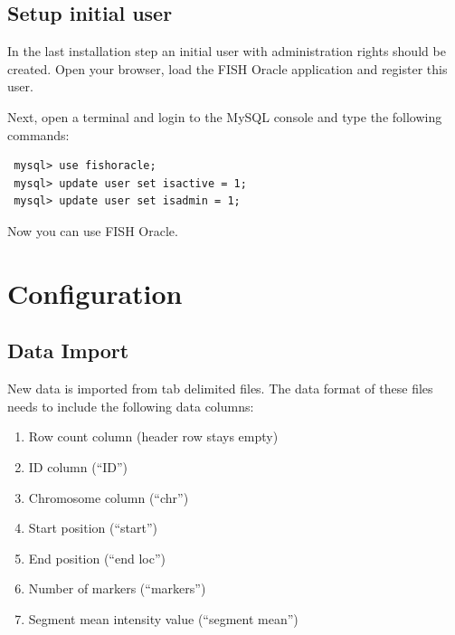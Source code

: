 \documentclass[11pt,final]{article}
\newcommand{\Gt}[0]{\emph{GenomeTools}\xspace}
\newcommand{\Gtj}[0]{\emph{GenomeTools-Java}\xspace}
\begin{document}
\subsection{Setup initial user}

In the last installation step an initial user with administration rights 
should be created. Open your browser, load the FISH Oracle application
and register this user.

Next, open a terminal and login to the MySQL console and type the following 
commands:

\begin{lstlisting}
 mysql> use fishoracle;
 mysql> update user set isactive = 1;
 mysql> update user set isadmin = 1;
\end{lstlisting}

Now you can use FISH Oracle.





\section{Configuration}

\subsection{Data Import}

New data is imported from tab delimited files. The data format of these files needs to
include the following data columns:

\begin{enumerate}
  \item Row count column (header row stays empty)
  \item ID column (``ID'')
  \item Chromosome column (``chr'')
  \item Start position (``start'')
  \item End position (``end loc'')
  \item Number of markers (``markers'')
  \item Segment mean intensity value (``segment mean'')
\end{enumerate}
\end{document}
